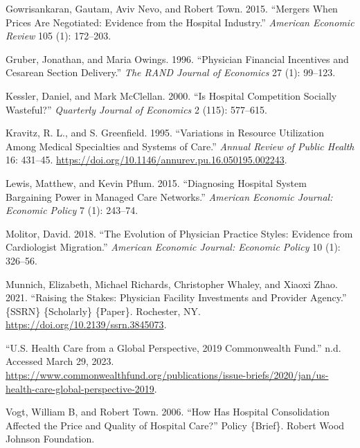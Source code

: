\documentclass[
  letterpaper,
  DIV=11,
  numbers=noendperiod]{scrreport}
\newlength{\cslhangindent}
\newlength{\cslentryspacingunit} %
\newenvironment{CSLReferences}[2] %
 {%
  \setlength{\parindent}{0pt}
  \ifodd #1
  \let\oldpar\par
  \def\par{\hangindent=\cslhangindent\oldpar}
  \fi
  \setlength{\parskip}{#2\cslentryspacingunit}
 }%
 {}
\theoremstyle{definition}
\theoremstyle{remark}
\begin{document}
\begin{CSLReferences}{1}{0}
\leavevmode{}%
Gowrisankaran, Gautam, Aviv Nevo, and Robert Town. 2015. {``Mergers
{When} {Prices} {Are} {Negotiated}: {Evidence} from the {Hospital}
{Industry}.''} \emph{American Economic Review} 105 (1): 172--203.

\leavevmode{}%
Gruber, Jonathan, and Maria Owings. 1996. {``Physician Financial
Incentives and Cesarean Section Delivery.''} \emph{The RAND Journal of
Economics} 27 (1): 99--123.

\leavevmode{}%
Kessler, Daniel, and Mark McClellan. 2000. {``Is Hospital Competition
Socially Wasteful?''} \emph{Quarterly Journal of Economics} 2 (115):
577--615.

\leavevmode{}%
Kravitz, R. L., and S. Greenfield. 1995. {``Variations in Resource
Utilization Among Medical Specialties and Systems of Care.''}
\emph{Annual Review of Public Health} 16: 431--45.
\url{https://doi.org/10.1146/annurev.pu.16.050195.002243}.

\leavevmode{}%
Lewis, Matthew, and Kevin Pflum. 2015. {``Diagnosing {Hospital} {System}
{Bargaining} {Power} in {Managed} {Care} {Networks}.''} \emph{American
Economic Journal: Economic Policy} 7 (1): 243--74.

\leavevmode{}%
Molitor, David. 2018. {``The Evolution of Physician Practice Styles:
Evidence from Cardiologist Migration.''} \emph{American Economic
Journal: Economic Policy} 10 (1): 326--56.

\leavevmode{}%
Munnich, Elizabeth, Michael Richards, Christopher Whaley, and Xiaoxi
Zhao. 2021. {``Raising the {Stakes}: {Physician} {Facility}
{Investments} and {Provider} {Agency}.''} \{SSRN\} \{Scholarly\}
\{Paper\}. Rochester, NY. \url{https://doi.org/10.2139/ssrn.3845073}.

\leavevmode{}%
{``U.{S}. {Health} {Care} from a {Global} {Perspective}, 2019 {\textbar}
{Commonwealth} {Fund}.''} n.d. Accessed March 29, 2023.
\url{https://www.commonwealthfund.org/publications/issue-briefs/2020/jan/us-health-care-global-perspective-2019}.

\leavevmode{}%
Vogt, William B, and Robert Town. 2006. {``How Has Hospital
Consolidation Affected the Price and Quality of Hospital Care?''} Policy
\{Brief\}. Robert Wood Johnson Foundation.

\end{CSLReferences}
\end{document}
